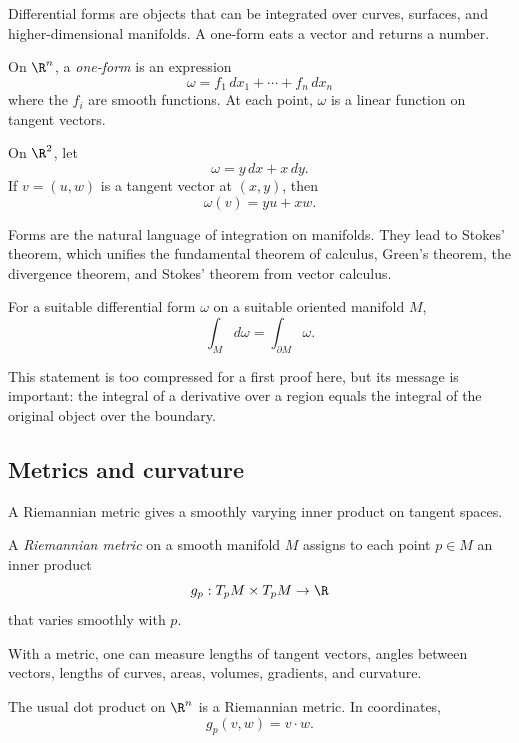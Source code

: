 Differential forms are objects that can be integrated over curves, surfaces,
and higher-dimensional manifolds. A one-form eats a vector and returns a number.

\begin{definition}
On $\R^n$, a \emph{one-form} is an expression
\[
\omega=f_1\,dx_1+\cdots+f_n\,dx_n
\]
where the $f_i$ are smooth functions. At each point, $\omega$ is a linear
function on tangent vectors.
\end{definition}

\begin{example}
On $\R^2$, let
\[
\omega=y\,dx+x\,dy.
\]
If $v=(u,w)$ is a tangent vector at $(x,y)$, then
\[
\omega(v)=yu+xw.
\]
\end{example}

Forms are the natural language of integration on manifolds. They lead to
Stokes' theorem, which unifies the fundamental theorem of calculus, Green's
theorem, the divergence theorem, and Stokes' theorem from vector calculus.

\begin{theorem}
For a suitable differential form $\omega$ on a suitable oriented manifold $M$,
\[
\int_M d\omega=\int_{\partial M}\omega.
\]
\end{theorem}

This statement is too compressed for a first proof here, but its message is
important: the integral of a derivative over a region equals the integral of the
original object over the boundary.

\subsection{Metrics and curvature}

A Riemannian metric gives a smoothly varying inner product on tangent spaces.

\begin{definition}
A \emph{Riemannian metric} on a smooth manifold $M$ assigns to each point
$p\in M$ an inner product
\[
g_p:T_pM\times T_pM\to\R
\]
that varies smoothly with $p$.
\end{definition}

With a metric, one can measure lengths of tangent vectors, angles between
vectors, lengths of curves, areas, volumes, gradients, and curvature.

\begin{example}
The usual dot product on $\R^n$ is a Riemannian metric. In coordinates,
\[
g_p(v,w)=v\cdot w.
\]
\end{example}

